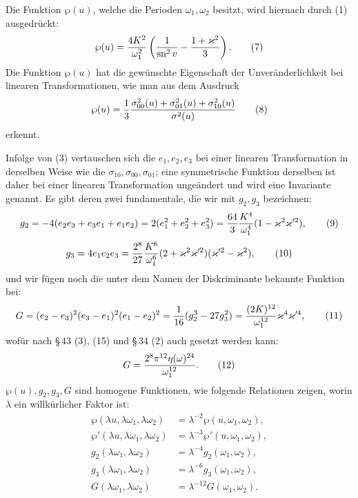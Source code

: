 \documentclass[11pt]{article}
\providecommand{\sn}{\operatorname{sn}}
\begin{document}
Die Funktion $\wp(u)$, welche die Perioden $\omega_1,\omega_2$ besitzt, wird hiernach durch (1) ausgedrückt:
\begin{equation}
\wp(u)={4K^2\over\omega_1^2}\left({1\over\sn^2v}-{1+\varkappa^2\over3}\right).
\tag{7}
\end{equation}
Die Funktion $\wp(u)$ hat die gewünschte Eigenschaft der Unveränderlichkeit bei linearen Transformationen, wie man aus dem Ausdruck
\begin{equation}
\wp(u)={1\over3}{\sigma_{00}^2(u)+\sigma_{01}^2(u)+\sigma_{10}^2(u)\over\sigma^2(u)}
\tag{8}
\end{equation}
erkennt.

Infolge von (3) vertauschen sich die $e_1,e_2,e_3$ bei einer linearen Transformation in derselben Weise wie die $\sigma_{10},\sigma_{00},\sigma_{01}$; eine symmetrische Funktion derselben ist daher bei einer linearen Transformation ungeändert und wird eine Invariante genannt. Es gibt deren zwei fundamentale, die wir mit $g_2,g_3$ bezeichnen:
\begin{equation}
g_2=-4(e_2e_3+e_3e_1+e_1e_2)=2(e_1^2+e_2^2+e_3^2)
={64\over3}{K^4\over\omega_1^4}(1-\varkappa^2\varkappa'^2),
\tag{9}
\end{equation}
\begin{equation}
g_3=4e_1e_2e_3={2^8\over27}{K^6\over\omega_1^6}(2+\varkappa^2\varkappa'^2)(\varkappa'^2-\varkappa^2),
\tag{10}
\end{equation}
und wir fügen noch die unter dem Namen der Diskriminante bekannte Funktion bei:
\begin{equation}
G=(e_2-e_3)^2(e_3-e_1)^2(e_1-e_2)^2={1\over16}(g_2^3-27g_3^2)
={(2K)^{12}\over\omega_1^{12}}\varkappa^4\varkappa'^4,
\tag{11}
\end{equation}
wofür nach \S\,43 (3), (15) und \S\,34 (2) auch gesetzt werden kann:
\begin{equation}
G={2^8\pi^{12}\eta(\omega)^{24}\over\omega_1^{12}}.
\tag{12}
\end{equation}
$\wp(u),g_2,g_3,G$ sind homogene Funktionen, wie folgende Relationen zeigen, worin $\lambda$ ein willkürlicher Faktor ist:
\begin{equation}
\begin{aligned}
\wp(\lambda u,\lambda\omega_1,\lambda\omega_2)&=\lambda^{-2}\wp(u,\omega_1,\omega_2),\\
\wp'(\lambda u,\lambda\omega_1,\lambda\omega_2)&=\lambda^{-3}\wp'(u,\omega_1,\omega_2),\\
g_2(\lambda\omega_1,\lambda\omega_2)&=\lambda^{-4}g_2(\omega_1,\omega_2),\\
g_3(\lambda\omega_1,\lambda\omega_2)&=\lambda^{-6}g_3(\omega_1,\omega_2),\\
G(\lambda\omega_1,\lambda\omega_2)&=\lambda^{-12}G(\omega_1,\omega_2).
\end{aligned}
\tag{13}
\end{equation}
\end{document}
